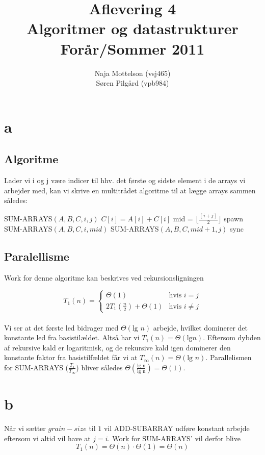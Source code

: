 \documentclass[10pt,a4paper,danish]{article}
\title{Aflevering 4 \\Algoritmer og datastrukturer\\Forår/Sommer 2011}
\author{Naja Mottelson (vsj465)\\Søren Pilgård (vpb984)}
\begin{document}
\maketitle
\newpage

\tableofcontents
\newpage

\section{a}
\subsection{Algoritme}
Lader vi i og j være indicer til hhv. det første og sidste element i de arrays vi 
arbejder med, kan vi skrive en multitrådet algoritme til at lægge arrays sammen således: 
\\

\begin{algorithmic}[1]
\STATE SUM-ARRAYS$(A, B, C, i, j)$
    \STATE $ C[i] = A[i] + C[i]$
\ELSE
    \STATE mid = $\lfloor \frac{(i + j)} 2 \rfloor$ 
    \STATE spawn SUM-ARRAYS$(A, B, C, i, mid)$
    \STATE SUM-ARRAYS$(A, B, C, mid + 1, j)$
	\STATE sync
\ENDIF
\end{algorithmic}

\subsection{Paralellisme}
Work for denne algoritme kan beskrives ved rekursionsligningen

$$
T_1(n) =
  \begin{cases}
    \Theta(1) & \text{hvis } i = j \\
   2T_1(\frac{n} {2}) + \Theta(1)& \text{hvis } i \neq j
  \end{cases}
$$
\\
Vi ser at det første led bidrager med $\Theta(\text{lg }n)$ arbejde, hvilket
dominerer det konstante led fra basistilældet. Altså har vi $T_1(n) =\Theta(\text{lg} n)$. 
Eftersom dybden af rekursive kald er logaritmisk, og de rekursive kald igen dominerer
den konstante faktor fra basistilfældet får vi at $T_\infty(n) = \Theta(\text{lg } n)$. 
Parallelismen for SUM-ARRAYS ($\frac{T_1} {T_\infty}$) bliver således $\Theta(\frac{\text{lg n}} {\text{lg n}}) = \Theta(1)$. 

\section{b}
Når vi sætter $grain-size$ til $1$ vil ADD-SUBARRAY udføre konstant arbejde eftersom
vi altid vil have at $j = i$. Work for SUM-ARRAYS' vil derfor blive 
$$T_1(n) = \Theta(n) \cdot \Theta(1) = \Theta(n)$$
\end{document}
